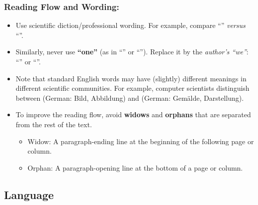 \documentclass[11pt,a4paper]{article}
\begin{document}
\subsubsection*{Reading Flow and Wording:}
\begin{itemize}
  
  \item Use scientific diction/professional wording. For example, compare ``'' \emph{versus} ``''.

  \item Similarly, never use \textbf{``one''} (as in ``'' or ``''). Replace it by the \emph{author's ``we''}: ``'' or ``''.

  \item Note that standard English words may have (slightly) different meanings in different scientific communities.
  For example, computer scientists distinguish between  (German: Bild, Abbildung) and  (German: Gem\"alde, Darstellung).

\item To improve the reading flow, avoid \textbf{widows} and \textbf{orphans} that are separated
from the rest of the text.
    \begin{itemize}
    \item Widow: A paragraph-ending line at the beginning of the following page or column.
    \item Orphan: A paragraph-opening line at the bottom of a page or column.
    \end{itemize}

\end{itemize}


\subsection{Language}
\label{sec-spec:lang}
\end{document}

